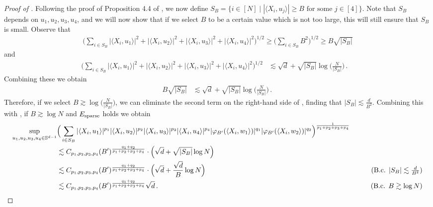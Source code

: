 \begin{proof}[Proof of ]
Following the proof of Proposition 4.4 of \citet{ALPT2009_concentration}, we now define $S_B = \{i \in [N] \mid |\langle X_i, u_j \rangle| \geq B \text{ for some }j \in [4]\}$. Note that $S_B$ depends on $u_1, u_2, u_3, u_4$, and we will now show that if we select $B$ to be a certain value which is not too large, this will still ensure that $S_B$ is small. Observe that
\begin{align}
\Big(\sum_{i \in S_B} |\langle X_i, u_1 \rangle|^2 + |\langle X_i, u_2 \rangle|^2 + |\langle X_i, u_3 \rangle|^2 + |\langle X_i, u_4 \rangle|^2 \Big)^{1/2} \geq \Big(\sum_{i \in S_B} B^2\Big)^{1/2} \geq B\sqrt{|S_B|}
\end{align}
and
\begin{align}
\Big(\sum_{i \in S_B} |\langle X_i, u_1 \rangle|^2 + |\langle X_i, u_2 \rangle|^2 + |\langle X_i, u_3 \rangle|^2 + |\langle X_i, u_4 \rangle|^2 \Big)^{1/2}
& \lesssim \sqrt{d} + \sqrt{|S_B|} \log\Big(\frac{N}{|S_B|}\Big) \period
& \tag{B.c. $\Esparse$ holds}
\end{align}
Combining these we obtain
\begin{align} \label{eq:recursion_for_B}
B\sqrt{|S_B|}
& \lesssim \sqrt{d} + \sqrt{|S_B|} \log\Big(\frac{N}{|S_B|}\Big) \period
\end{align}
Therefore, if we select $B \gtrsim \log\Big(\frac{N}{|S_B|}\Big)$, we can eliminate the second term on the right-hand side of , finding that $|S_B| \lesssim \frac{d}{B^2}$. Combining this with , if $B \gtrsim \log N$ and ${E_{\textup{sparse}}}$ holds we obtain
\begin{align}
\sup_{u_1, u_2, u_3, u_4 \in \bbS^{d - 1}}&  \Big( \sum_{i \in S_B} |\langle X_i, u_1 \rangle|^{p_1} |\langle X_i, u_2 \rangle|^{p_2} |\langle X_i, u_3 \rangle|^{p_3} |\langle X_i, u_4 \rangle|^{p_4}  |\truncBprime(\langle X_i, w_1 \rangle)|^{q_1} |\truncBprime(\langle X_i, w_2 \rangle)|^{q_2}\Big)^{\frac{1}{p_1 + p_2 + p_3 + p_4}} \\
& \lesssim C_{p_1, p_2, p_3, p_4} (B')^{\frac{q_1 + q_2}{p_1 + p_2 + p_3 + p_4}} \cdot \Big(\sqrt{d} + \sqrt{|S_B|} \log N\Big) \\
& \lesssim C_{p_1, p_2, p_3, p_4} (B')^{\frac{q_1 + q_2}{p_1 + p_2 + p_3 + p_4}} \cdot \Big(\sqrt{d} + \frac{\sqrt{d}}{B} \log N\Big)
& \tag{B.c. $|S_B| \lesssim \frac{d}{B^2}$} \\
& \lesssim C_{p_1, p_2, p_3, p_4} (B')^{\frac{q_1 + q_2}{p_1 + p_2 + p_3 + p_4}} \sqrt{d} \period
& \tag{B.c. $B \gtrsim \log N$}
\end{align}

\end{proof}
